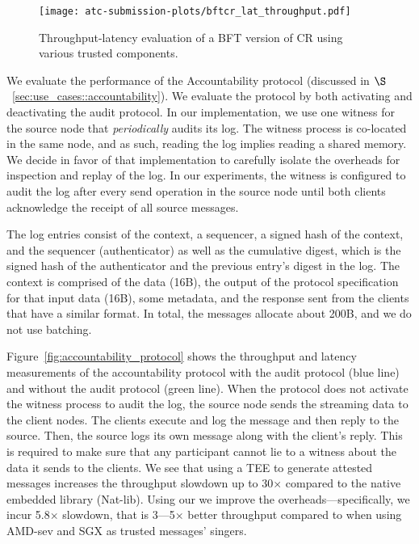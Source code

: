 \begin{figure}[t!]
    \centering
    \texttt{[image: atc-submission-plots/bftcr\_lat\_throughput.pdf]} 
    \caption{Throughput-latency evaluation of a BFT version of CR using various trusted components.} \label{fig:lat_throughput_kernel}
\end{figure}
\fi






 We evaluate the performance of the Accountability protocol (discussed in $\S$~\ref{sec:use_cases::accountability}). %
We evaluate the protocol by both activating and deactivating the audit protocol. In our implementation, we use one witness for the source node that {\em periodically} audits its log. The witness process is co-located in the same node, and as such, reading the log implies reading a shared memory. We decide in favor of that implementation to carefully isolate the overheads for inspection and replay of the log. In our experiments, the witness is configured to audit the log after every send operation in the source node until both clients acknowledge the receipt of all source messages.

The log entries consist of the context, a sequencer, a signed hash of the context, and the sequencer (authenticator)  as well as the cumulative digest, which is the signed hash of the authenticator and the previous entry's digest in the log. The context is comprised of the data (16B), the output of the protocol specification for that input data (16B), some metadata, and the response sent from the clients that have a similar format. In total, the messages allocate about 200B, and we do not use batching. 

 Figure~\ref{fig:accountability_protocol} shows the throughput and latency measurements of the accountability protocol with the audit protocol (blue line) and without the audit protocol (green line).
 When the protocol does not activate the witness process to audit the log, the source node sends the streaming data to the client nodes. The clients execute and log the message and then reply to the source. Then, the source logs its own message along with the client's reply. This is required to make sure that any participant cannot lie to a witness about the data it sends to the clients.  We see that using a TEE to generate attested messages increases the throughput slowdown up to 30$\times$ compared to the native embedded library (Nat-lib). Using our \projecttitle{} we improve the overheads---specifically, we incur 5.8$\times$ slowdown, that is 3---5$\times$ better throughput compared to when using AMD-sev and SGX as trusted messages' singers.

